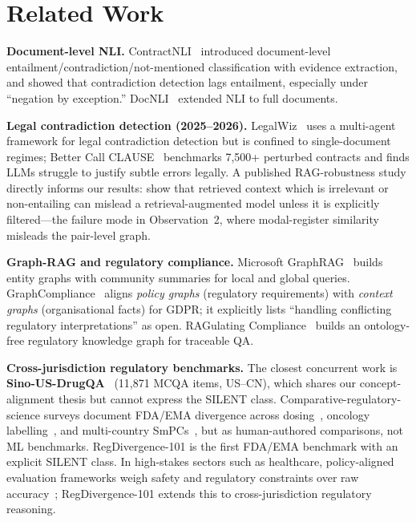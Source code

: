 \documentclass[manuscript]{acmart}
\begin{document}
\section{Related Work}

\textbf{Document-level NLI.} ContractNLI~\cite{koreeda2021contractnli} introduced
document-level entailment/contradiction/not-mentioned classification with
evidence extraction, and showed that contradiction detection lags entailment,
especially under ``negation by exception.'' DocNLI~\cite{yin2021docnli} extended
NLI to full documents.

\textbf{Legal contradiction detection (2025--2026).}
LegalWiz~\cite{legalwiz2025} uses a multi-agent framework for legal
contradiction detection but is confined to single-document regimes; Better Call
CLAUSE~\cite{betterclause2026} benchmarks 7,500+ perturbed contracts and finds
LLMs struggle to justify subtle errors legally. A published RAG-robustness study
directly informs our results: \citet{yoran2024robust} show that retrieved
context which is irrelevant or non-entailing can mislead a retrieval-augmented
model unless it is explicitly filtered---the failure mode in Observation~2,
where modal-register similarity misleads the pair-level graph.

\textbf{Graph-RAG and regulatory compliance.}
Microsoft GraphRAG~\cite{edge2024graphrag} builds entity graphs with community
summaries for local and global queries. GraphCompliance~\cite{graphcompliance2025}
aligns \textit{policy graphs} (regulatory requirements) with \textit{context
graphs} (organisational facts) for GDPR; it explicitly lists ``handling
conflicting regulatory interpretations'' as open. RAGulating
Compliance~\cite{ragulating2025} builds an ontology-free regulatory knowledge
graph for traceable QA.

\textbf{Cross-jurisdiction regulatory benchmarks.}
The closest concurrent work is \textbf{Sino-US-DrugQA}~\cite{sinousdrugqa2026}
(11{,}871 MCQA items, US--CN), which shares our concept-alignment thesis but
cannot express the SILENT class. Comparative-regulatory-science surveys document
FDA/EMA divergence across dosing~\cite{mita2026doses}, oncology
labelling~\cite{gomezfernandez2026inhibitors}, and multi-country
SmPCs~\cite{pvverse2026}, but as human-authored comparisons, not ML benchmarks.
RegDivergence-101 is the first FDA/EMA benchmark with an explicit SILENT class.
In high-stakes sectors such as healthcare, policy-aligned evaluation frameworks
weigh safety and regulatory constraints over raw accuracy~\cite{chen2026dlsg};
RegDivergence-101 extends this to cross-jurisdiction regulatory reasoning.
\end{document}
